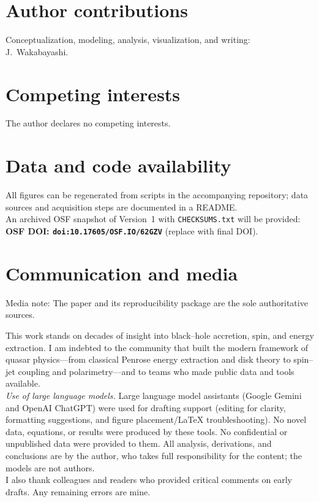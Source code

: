 \documentclass[twocolumn]{aastex701}
\begin{document}
\section*{Author contributions}
Conceptualization, modeling, analysis, visualization, and writing: J.~Wakabayashi.

\section*{Competing interests}
The author declares no competing interests.

\section*{Data and code availability}
All figures can be regenerated from scripts in the accompanying repository; data sources and acquisition steps are documented in a README.\\
An archived OSF snapshot of Version~1 with \texttt{CHECKSUMS.txt} will be provided: \textbf{OSF DOI: \texttt{doi:10.17605/OSF.IO/62GZV}} (replace with final DOI).
\section*{Communication and media}
Media note: The paper and its reproducibility package are the sole authoritative sources.

\begin{acknowledgments}
This work stands on decades of insight into black–hole accretion, spin, and energy extraction. I am indebted to the community that built the modern framework of quasar physics—from classical Penrose energy extraction and disk theory to spin–jet coupling and polarimetry—and to teams who made public data and tools available.
\\[2pt]
\textit{Use of large language models.} Large language model assistants (Google Gemini and OpenAI ChatGPT) were used for drafting support (editing for clarity, formatting suggestions, and figure placement/LaTeX troubleshooting). No novel data, equations, or results were produced by these tools. No confidential or unpublished data were provided to them. All analysis, derivations, and conclusions are by the author, who takes full responsibility for the content; the models are not authors.
\\[2pt]
I also thank colleagues and readers who provided critical comments on early drafts. Any remaining errors are mine.
\end{acknowledgments}


\nocite{*}


\end{document}
